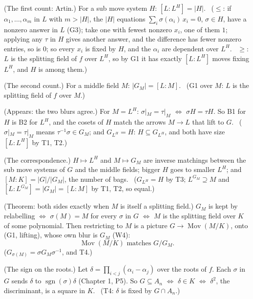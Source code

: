 \begin{lines}
\item[\lab{T1}] (The first count: Artin.) For a sub move system $H$: $[L : L^H] = |H|$. \ ($\le$: if $\alpha_1, \dots, \alpha_m$ in $L$ with $m > |H|$, the $|H|$ equations $\sum_i \sigma(\alpha_i)\, x_i = 0$, $\sigma \in H$, have a nonzero answer in $L$ (G3); take one with fewest nonzero $x_i$, one of them $1$; applying any $\tau$ in $H$ gives another answer, and the difference has fewer nonzero entries, so is $0$; so every $x_i$ is fixed by $H$, and the $\alpha_i$ are dependent over $L^H$. \ $\ge$: $L$ is the splitting field of $f$ over $L^H$, so by G1 it has exactly $[L : L^H]$ moves fixing $L^H$, and $H$ is among them.)
\item[\lab{T2}] (The second count.) For a middle field $M$: $|G_M| = [L : M]$. \ (G1 over $M$: $L$ is the splitting field of $f$ over $M$.)
\item[\lab{T3}] (Appears: the two blurs agree.) For $M = L^H$: $\sigma|_M = \tau|_M$ $\iff$ $\sigma H = \tau H$. So B1 for $H$ is B2 for $L^H$, and the cosets of $H$ match the arrows $M \to L$ that lift to $G$. \ ($\sigma|_M = \tau|_M$ means $\tau^{-1}\sigma \in G_M$; and $G_{L^H} = H$: $H \subseteq G_{L^H}$, and both have size $[L : L^H]$ by T1, T2.)
\item[\lab{T4}] (The correspondence.) $H \mapsto L^H$ and $M \mapsto G_M$ are inverse matchings between the sub move systems of $G$ and the middle fields; bigger $H$ goes to smaller $L^H$; and $[M : K] = |G| / |G_M|$, the number of bags. \ ($G_{L^H} = H$ by T3; $L^{G_M} \supseteq M$ and $[L : L^{G_M}] = |G_M| = [L : M]$ by T1, T2, so equal.)
\item[\lab{T5}] (Theorem: both sides exactly when $M$ is itself a splitting field.) $G_M$ is kept by relabelling $\iff$ $\sigma(M) = M$ for every $\sigma$ in $G$ $\iff$ $M$ is the splitting field over $K$ of some polynomial. Then restricting to $M$ is a picture $G \to \operatorname{Mov}(M/K)$, onto (G1, lifting), whose own blur is $G_M$ (W4): \[ \operatorname{Mov}(M/K) \text{ matches } G / G_M . \] ($G_{\sigma(M)} = \sigma G_M \sigma^{-1}$, and T4.)
\item[\lab{T6}] (The sign on the roots.) Let $\delta = \prod_{i < j} (\alpha_i - \alpha_j)$ over the roots of $f$. Each $\sigma$ in $G$ sends $\delta$ to $\operatorname{sgn}(\sigma)\delta$ (Chapter 1, P5). So $G \subseteq A_n$ $\iff$ $\delta \in K$ $\iff$ $\delta^2$, the discriminant, is a square in $K$. \ (T4: $\delta$ is fixed by $G \cap A_n$.)
\end{lines}


